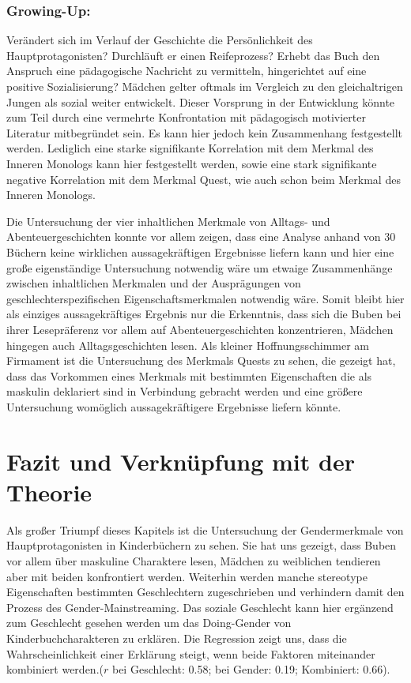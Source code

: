 \subsubsection{Growing-Up:}

Verändert sich im Verlauf der Geschichte die Persönlichkeit des
Hauptprotagonisten? Durchläuft er einen Reifeprozess? Erhebt das Buch
den Anspruch eine pädagogische Nachricht zu vermitteln, hingerichtet auf
eine positive Sozialisierung? Mädchen gelter oftmals im Vergleich zu den
gleichaltrigen Jungen als sozial weiter entwickelt. Dieser Vorsprung in
der Entwicklung könnte zum Teil durch eine vermehrte Konfrontation mit
pädagogisch motivierter Literatur mitbegründet sein. Es kann hier jedoch
kein Zusammenhang festgestellt werden. Lediglich eine starke
signifikante Korrelation mit dem Merkmal des Inneren Monologs kann hier
festgestellt werden, sowie eine stark signifikante negative Korrelation
mit dem Merkmal Quest, wie auch schon beim Merkmal des Inneren Monologs.

Die Untersuchung der vier inhaltlichen Merkmale von Alltags- und
Abenteuergeschichten konnte vor allem zeigen, dass eine Analyse anhand
von 30 Büchern keine wirklichen aussagekräftigen Ergebnisse liefern kann
und hier eine große eigenständige Untersuchung notwendig wäre um etwaige
Zusammenhänge zwischen inhaltlichen Merkmalen und der Ausprägungen von
geschlechterspezifischen Eigenschaftsmerkmalen notwendig wäre. Somit
bleibt hier als einziges aussagekräftiges Ergebnis nur die Erkenntnis,
dass sich die Buben bei ihrer Lesepräferenz vor allem auf
Abenteuergeschichten konzentrieren, Mädchen hingegen auch
Alltagsgeschichten lesen. Als kleiner Hoffnungsschimmer am Firmament ist
die Untersuchung des Merkmals Quests zu sehen, die gezeigt hat, dass das
Vorkommen eines Merkmals mit bestimmten Eigenschaften die als maskulin
deklariert sind in Verbindung gebracht werden und eine größere
Untersuchung womöglich aussagekräftigere Ergebnisse liefern könnte.

\section{Fazit und Verknüpfung mit der Theorie}

Als großer Triumpf dieses Kapitels ist die Untersuchung der
Gendermerkmale von Hauptprotagonisten in Kinderbüchern zu sehen. Sie hat
uns gezeigt, dass Buben vor allem über maskuline Charaktere lesen,
Mädchen zu weiblichen tendieren aber mit beiden konfrontiert werden.
Weiterhin werden manche stereotype Eigenschaften bestimmten
Geschlechtern zugeschrieben und verhindern damit den Prozess des
Gender-Mainstreaming. Das soziale Geschlecht kann hier ergänzend zum
Geschlecht gesehen werden um das Doing-Gender von Kinderbuchcharakteren
zu erklären. Die Regression zeigt uns, dass die Wahrscheinlichkeit einer
Erklärung steigt, wenn beide Faktoren miteinander kombiniert werden.($r$
bei Geschlecht: 0.58; bei Gender: 0.19; Kombiniert: 0.66).

